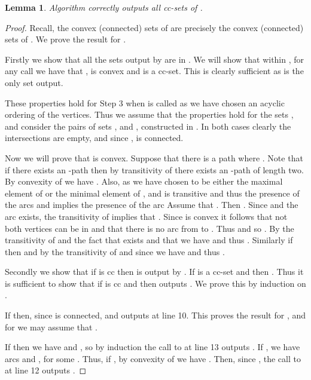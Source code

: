 \documentclass[11pt]{article}
\newcommand{\2}{\vspace{0.2 cm}}
\newtheorem{lemma}[theorem]{Lemma}
\begin{document}
\2

\begin{lemma}\label{corlem}
Algorithm  correctly outputs all cc-sets of .
\end{lemma}
\begin{proof}
Recall, the convex (connected) sets of  are precisely the convex
(connected) sets of . We prove the result for .

Firstly we show that all the sets  output by  are in
. We will show that within , for any call
 we have that ,  is
convex and  is a cc-set. This is clearly sufficient as  is the only set output.

These properties hold for Step 3 when  is called as we have chosen an acyclic
ordering of the vertices.  Thus we assume that the properties hold for the sets
,  and consider the pairs of sets ,  and ,
 constructed in . In both cases
clearly the intersections are empty, and since ,  is connected.

Now we will prove that  is convex. Suppose that there is a path 
where . Note that if there exists an -path then by
transitivity of  there exists an -path of length two. By
convexity of  we have . Also,  as we have chosen 
to be either the maximal element of  or the minimal element of
, and  is transitive and thus the presence of the arcs 
and  implies the presence of the arc  Assume that . Then
. Since  and the arc 
exists, the transitivity of  implies that . Since 
is convex it follows that not both vertices   can be in   and that there is
no arc from  to . Thus  and so 
. By the transitivity of  and the fact that
 exists and that  we have  and thus
. Similarly if   then  and by the
transitivity of  and since   we have  
and thus . 






Secondly we show that if  is cc then  is output
by .
If  is a cc-set and  then . Thus it is
sufficient to show that if  is cc and  then  outputs . We prove this by
induction on .

If  then, since  is connected,
 and  outputs  at line 10. This proves the
result for , and for  we may assume that .

If  then we have  and , so
by induction the call to  at line 13
outputs . If , we have arcs  and
, for some . Thus, if , by convexity
of  we have . Then, since ,
the call to  at line 12 outputs
.
\end{proof}
\end{document}
